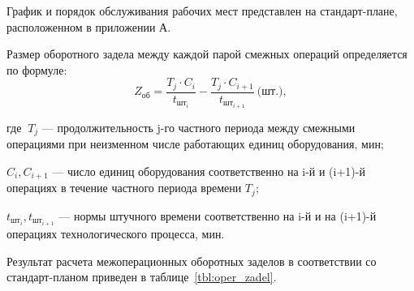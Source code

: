 График и порядок обслуживания рабочих мест представлен на стандарт-плане,
расположенном в приложении А.

Размер оборотного задела между каждой парой смежных операций определяется 
по формуле:
\begin{equation*}
  Z_{\text{об}} = 
  \dfrac{T_j \cdot C_i}{t_{\text{шт}_i}} - \dfrac{T_j \cdot C_{i+1}}{t_{\text{шт}_{i+1}}} 
  \: \text{(шт.)},
\end{equation*}

\noindent где \( \: T_j \) --- продолжительность j-го частного периода между смежными 
операциями при неизменном числе работающих единиц оборудования, мин;

\( C_i, C_{i+1} \) --- число единиц оборудования соответственно на i-й и 
(i+1)-й операциях в течение частного периода времени \( T_j \);

\( t_{\text{шт}_i}, t_{\text{шт}_{i+1}}\) --- нормы штучного времени соответственно на
i-й и на (i+1)-й операциях технологического процесса, мин.

Результат расчета межоперационных оборотных заделов в соответствии со 
стандарт-планом приведен в таблице~\ref{tbl:oper_zadel}.

